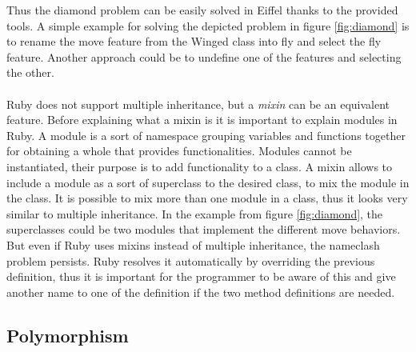 \documentclass[12pt,a4paper,twocolumn]{article}
\begin{document}
Thus the diamond problem can be easily solved in Eiffel thanks to the provided tools. A simple example for solving the depicted problem in figure \ref{fig:diamond} is to rename the move feature from the Winged class into fly and select the fly feature. Another approach could be to undefine one of the features and selecting the other.
\\
\\
Ruby does not support multiple inheritance,  but a \emph{mixin} can be an equivalent feature. Before explaining what a mixin is it is important to explain modules in Ruby. A module is a sort of namespace grouping variables and functions together for obtaining a whole that provides functionalities. Modules cannot be instantiated, their purpose is to add functionality to a class. A mixin allows to include a module as a sort of superclass to the desired class, to mix the module in the class. It is possible to mix more than one module in a class, thus it looks very similar to multiple inheritance. In the example from figure \ref{fig:diamond}, the superclasses could be two modules that implement the different move behaviors. But even if Ruby uses mixins instead of multiple inheritance, the nameclash problem persists. Ruby resolves it automatically by overriding the previous definition, thus it is important for the programmer to be aware of this and give another name to one of the definition if the two method definitions are needed.
\subsection{Polymorphism} %

\end{document}
